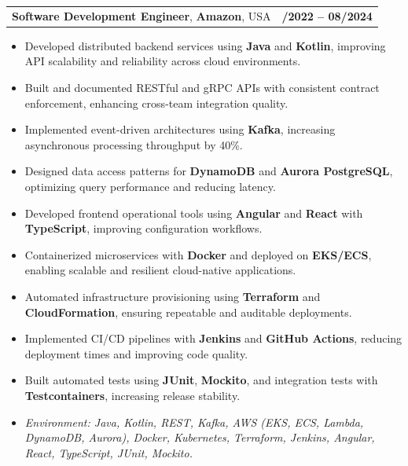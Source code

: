 \documentclass[letterpaper,11pt]{article}
\makeatletter
\newcommand{\resumeItem}[1]{
  \item\footnotesize{
    {#1 \vspace{-2pt}}
  }
}
\newcommand{\resumeSubheading}[4]{
  \vspace{-2pt}\item
    \begin{tabular*}{1.0\textwidth}[t]{l@{\extracolsep{\fill}}r}
      \textbf{\fontsize{10pt}{14pt}\selectfont #3}, \textbf{\fontsize{10pt}{14pt}\selectfont #1}, \fontsize{10pt}{14pt}\selectfont #4 & \textbf{\fontsize{10pt}{14pt}\selectfont #2} \\
    \end{tabular*}\vspace{-7pt}
}
\newcommand{\resumeItemListStart}{\begin{itemize}[leftmargin=*]}
\newcommand{\resumeItemListEnd}{\end{itemize}\vspace{-5pt}}
\makeatother
\begin{document}
\resumeSubheading
{Amazon}{10/2022 -- 08/2024}
{Software Development Engineer}{USA}
\resumeItemListStart
  \resumeItem{Developed distributed backend services using \textbf{Java} and \textbf{Kotlin}, improving API scalability and reliability across cloud environments.}
  \resumeItem{Built and documented RESTful and gRPC APIs with consistent contract enforcement, enhancing cross-team integration quality.}
  \resumeItem{Implemented event-driven architectures using \textbf{Kafka}, increasing asynchronous processing throughput by 40\%.}
  \resumeItem{Designed data access patterns for \textbf{DynamoDB} and \textbf{Aurora PostgreSQL}, optimizing query performance and reducing latency.}
  \resumeItem{Developed frontend operational tools using \textbf{Angular} and \textbf{React} with \textbf{TypeScript}, improving configuration workflows.}
  \resumeItem{Containerized microservices with \textbf{Docker} and deployed on \textbf{EKS/ECS}, enabling scalable and resilient cloud-native applications.}
  \resumeItem{Automated infrastructure provisioning using \textbf{Terraform} and \textbf{CloudFormation}, ensuring repeatable and auditable deployments.}
  \resumeItem{Implemented CI/CD pipelines with \textbf{Jenkins} and \textbf{GitHub Actions}, reducing deployment times and improving code quality.}
  \resumeItem{Built automated tests using \textbf{JUnit}, \textbf{Mockito}, and integration tests with \textbf{Testcontainers}, increasing release stability.}
  \resumeItem{\textit{Environment: Java, Kotlin, REST, Kafka, AWS (EKS, ECS, Lambda, DynamoDB, Aurora), Docker, Kubernetes, Terraform, Jenkins, Angular, React, TypeScript, JUnit, Mockito.}}
\resumeItemListEnd
\end{document}
